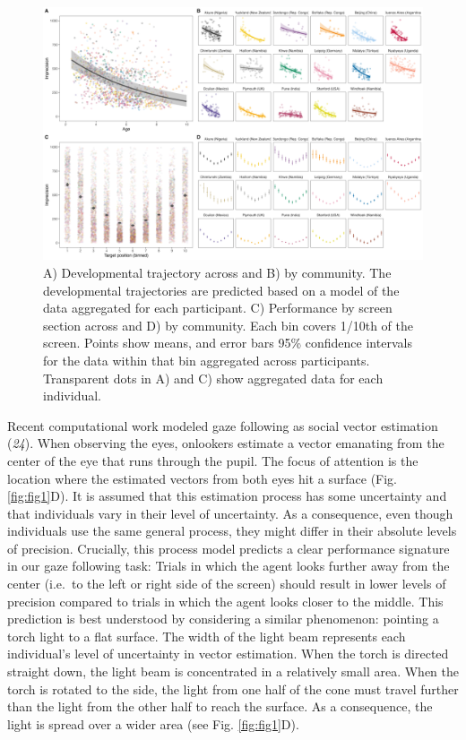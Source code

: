 \documentclass[
  man,floatsintext]{apa6}
\begin{document}
\begin{figure}

{\centering \includegraphics[width=1\linewidth]{../visuals/pvis_pred} 

}

\caption{A) Developmental trajectory across and B) by community. The developmental trajectories are predicted based on a model of the data aggregated for each participant. C) Performance by screen section across and D) by community. Each bin covers 1/10th of the screen. Points show means, and error bars 95\% confidence intervals for the data within that bin aggregated across participants. Transparent dots in A) and C) show aggregated data for each individual.}\label{fig:fig2}
\end{figure}

Recent computational work modeled gaze following as social vector estimation (\emph{24}). When observing the eyes, onlookers estimate a vector emanating from the center of the eye that runs through the pupil. The focus of attention is the location where the estimated vectors from both eyes hit a surface (Fig. \ref{fig:fig1}D). It is assumed that this estimation process has some uncertainty and that individuals vary in their level of uncertainty. As a consequence, even though individuals use the same general process, they might differ in their absolute levels of precision. Crucially, this process model predicts a clear performance signature in our gaze following task: Trials in which the agent looks further away from the center (i.e.~to the left or right side of the screen) should result in lower levels of precision compared to trials in which the agent looks closer to the middle. This prediction is best understood by considering a similar phenomenon: pointing a torch light to a flat surface. The width of the light beam represents each individual's level of uncertainty in vector estimation. When the torch is directed straight down, the light beam is concentrated in a relatively small area. When the torch is rotated to the side, the light from one half of the cone must travel further than the light from the other half to reach the surface. As a consequence, the light is spread over a wider area (see Fig. \ref{fig:fig1}D).
\end{document}
